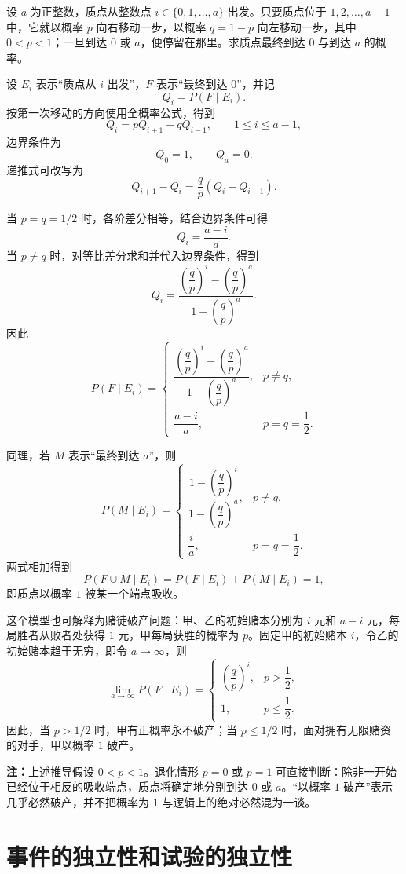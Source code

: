 \begin{example}[赌徒破产模型]
设 $a$ 为正整数，质点从整数点 $i\in\{0,1,\ldots,a\}$ 出发。只要质点位于 $1,2,\ldots,a-1$ 中，它就以概率 $p$ 向右移动一步，以概率 $q=1-p$ 向左移动一步，其中 $0<p<1$；一旦到达 $0$ 或 $a$，便停留在那里。求质点最终到达 $0$ 与到达 $a$ 的概率。

设 $E_i$ 表示“质点从 $i$ 出发”，$F$ 表示“最终到达 $0$”，并记
\[
Q_i=P(F\mid E_i).
\]
按第一次移动的方向使用全概率公式，得到
\[
Q_i=pQ_{i+1}+qQ_{i-1},
\qquad 1\leq i\leq a-1,
\]
边界条件为
\[
Q_0=1,
\qquad
Q_a=0.
\]
递推式可改写为
\[
Q_{i+1}-Q_i=\frac{q}{p}(Q_i-Q_{i-1}).
\]

当 $p=q=1/2$ 时，各阶差分相等，结合边界条件可得
\[
Q_i=\frac{a-i}{a}.
\]
当 $p\ne q$ 时，对等比差分求和并代入边界条件，得到
\[
Q_i
=\frac{\left(\dfrac qp\right)^i-\left(\dfrac qp\right)^a}
{1-\left(\dfrac qp\right)^a}.
\]
因此
\[
P(F\mid E_i)=
\begin{cases}
\dfrac{\left(\dfrac qp\right)^i-\left(\dfrac qp\right)^a}
{1-\left(\dfrac qp\right)^a},&p\ne q,\\[1.2em]
\dfrac{a-i}{a},&p=q=\dfrac12.
\end{cases}
\]

同理，若 $M$ 表示“最终到达 $a$”，则
\[
P(M\mid E_i)=
\begin{cases}
\dfrac{1-\left(\dfrac qp\right)^i}
{1-\left(\dfrac qp\right)^a},&p\ne q,\\[1.2em]
\dfrac{i}{a},&p=q=\dfrac12.
\end{cases}
\]
两式相加得到
\[
P(F\cup M\mid E_i)=P(F\mid E_i)+P(M\mid E_i)=1,
\]
即质点以概率 $1$ 被某一个端点吸收。

这个模型也可解释为赌徒破产问题：甲、乙的初始赌本分别为 $i$ 元和 $a-i$ 元，每局胜者从败者处获得 $1$ 元，甲每局获胜的概率为 $p$。固定甲的初始赌本 $i$，令乙的初始赌本趋于无穷，即令 $a\to\infty$，则
\[
\lim_{a\to\infty}P(F\mid E_i)=
\begin{cases}
\left(\dfrac qp\right)^i,&p>\dfrac12,\\[0.8em]
1,&p\leq\dfrac12.
\end{cases}
\]
因此，当 $p>1/2$ 时，甲有正概率永不破产；当 $p\leq1/2$ 时，面对拥有无限赌资的对手，甲以概率 $1$ 破产。
\end{example}

\textbf{注：}\quad 上述推导假设 $0<p<1$。退化情形 $p=0$ 或 $p=1$ 可直接判断：除非一开始已经位于相反的吸收端点，质点将确定地分别到达 $0$ 或 $a$。“以概率 $1$ 破产”表示几乎必然破产，并不把概率为 $1$ 与逻辑上的绝对必然混为一谈。

\section{事件的独立性和试验的独立性}

